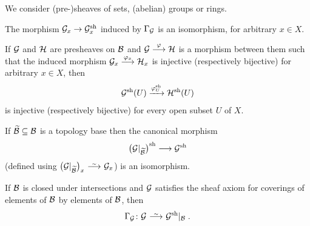 \documentclass[a4paper,parskip=half,numbers=enddot, DIV=12]{scrreprt}
\begin{document}
\begin{prop}
    We consider (pre-)sheaves of sets, (abelian) groups or rings.
    \begin{alphanumerate}
      \item 
        The morphism $\Gg_x \morphism \Gg^\sh_x$ induced by $\Gamma_{\mathcal{G}}$ is an isomorphism, for arbitrary $x\in X$.
      \item
        If $\mathcal{G}$ and $\mathcal{H}$ are presheaves on $\mathcal{B}$ and $\Gg\morphism[\phi] \Hh$ is a morphism between them such that the induced morphism $\Gg_x\morphism[\phi_x] \Hh_x$ is injective (respectively bijective) for arbitrary $x\in X$, then  
        \begin{align*}
            \mathcal{G}^{\mathrm{sh}}(U) \xrightarrow{\varphi_U^{\mathrm{sh}}} \mathcal{H}^{\mathrm{sh}}(U)
        \end{align*}
        is injective (respectively bijective) for every open subset $U$ of $X$.
      \item 
        If $\snake \Bb \subseteq \Bb$ is a topology base then the canonical morphism \begin{align*}
        	\big(\Gg|_{\snake\Bb}\big) ^\sh\morphism \Gg^\sh
        \end{align*}
        (defined using $\big(\Gg|_{\snake\Bb}\big)_x \isomorphism \Gg_x$)  is an isomorphism.
      \item 
        If $\mathcal{B}$ is closed under intersections and $\mathcal{G}$ satisfies the sheaf axiom for coverings of elements of $\mathcal{B}$ by elements of $\mathcal{B}$, then 
        \begin{align*}
        	\Gamma_\Gg\colon \Gg\isomorphism \Gg^\sh|_\Bb\;.
        \end{align*}
    \end{alphanumerate}
\end{prop}
\end{document}
